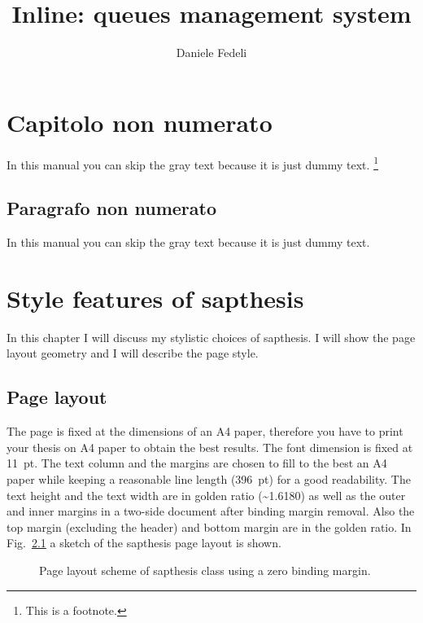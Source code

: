 \documentclass[Lau,binding=0.6cm]{sapthesis}
\title{Inline: queues management system}
\author{Daniele Fedeli}
\begin{document}
	
	\frontmatter
	
	\maketitle
\chapter{Capitolo non numerato}

In this manual you can skip the gray text because it is just dummy text.%
\footnote{This is a footnote.}




\section*{Paragrafo non numerato}

In this manual you can skip the gray text because it is just dummy text.

\chapter{Style features of \textsf{sapthesis}}

In this chapter I will discuss my stylistic choices of \textsf{sapthesis}.
I will show the page layout geometry and I will describe the page style.

\section{Page layout}

The page is fixed at the dimensions of an A4 paper, therefore you have to print your thesis on A4 paper to obtain the best results. The font dimension is fixed at 11\, pt. The text column and the margins are chosen to fill to the best an A4 paper while keeping a reasonable line length (396\, pt) for a good readability. The text height and the text width are in golden ratio (\textasciitilde 1.6180) as well as the outer and inner margins in a two-side document after binding margin removal. Also the top margin (excluding the header) and bottom margin are in the golden ratio. In Fig.~\ref{layout} a sketch of the \textsf{sapthesis} page layout is shown.

\begin{figure}[h]
\centering
\setlength{\unitlength}{0.27mm}

\caption{Page layout scheme of \textsf{sapthesis class} using a zero binding margin.}
\label{layout}
\end{figure}
\end{document}
